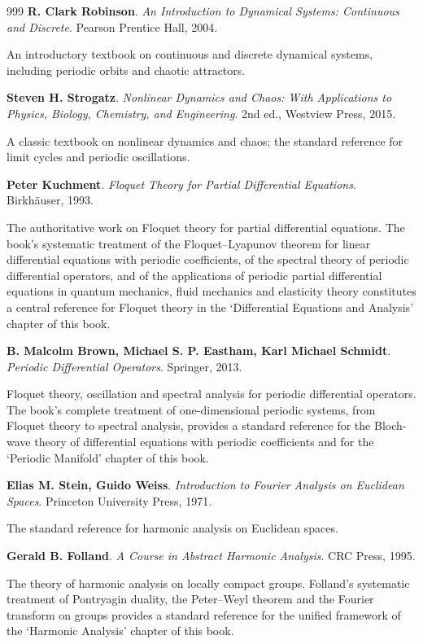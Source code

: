 \begin{thebibliography}{999}
 \textbf{R. Clark Robinson}. \textit{An Introduction to Dynamical Systems: Continuous and Discrete}. Pearson Prentice Hall, 2004.

An introductory textbook on continuous and discrete dynamical systems, including periodic orbits and chaotic attractors.

 \textbf{Steven H. Strogatz}. \textit{Nonlinear Dynamics and Chaos: With Applications to Physics, Biology, Chemistry, and Engineering}. 2nd ed., Westview Press, 2015.

A classic textbook on nonlinear dynamics and chaos; the standard reference for limit cycles and periodic oscillations.

 \textbf{Peter Kuchment}. \textit{Floquet Theory for Partial Differential Equations}. Birkh\"auser, 1993.

The authoritative work on Floquet theory for partial differential equations. The book's systematic treatment of the Floquet--Lyapunov theorem for linear differential equations with periodic coefficients, of the spectral theory of periodic differential operators, and of the applications of periodic partial differential equations in quantum mechanics, fluid mechanics and elasticity theory constitutes a central reference for Floquet theory in the `Differential Equations and Analysis' chapter of this book.

 \textbf{B. Malcolm Brown, Michael S. P. Eastham, Karl Michael Schmidt}. \textit{Periodic Differential Operators}. Springer, 2013.

Floquet theory, oscillation and spectral analysis for periodic differential operators. The book's complete treatment of one-dimensional periodic systems, from Floquet theory to spectral analysis, provides a standard reference for the Bloch-wave theory of differential equations with periodic coefficients and for the `Periodic Manifold' chapter of this book.

 \textbf{Elias M. Stein, Guido Weiss}. \textit{Introduction to Fourier Analysis on Euclidean Spaces}. Princeton University Press, 1971.

The standard reference for harmonic analysis on Euclidean spaces.

 \textbf{Gerald B. Folland}. \textit{A Course in Abstract Harmonic Analysis}. CRC Press, 1995.

The theory of harmonic analysis on locally compact groups. Folland's systematic treatment of Pontryagin duality, the Peter--Weyl theorem and the Fourier transform on groups provides a standard reference for the unified framework of the `Harmonic Analysis' chapter of this book.


\end{thebibliography}
